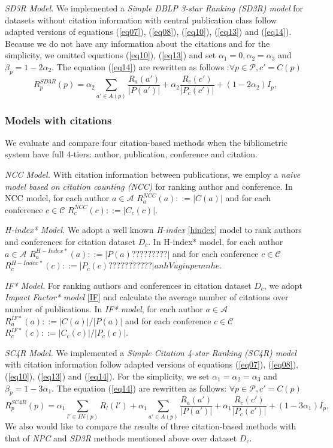 \documentclass[10pt,leqno,twoside]{article}
\begin{document}
\textit{SD3R Model.} We implemented a \textit{Simple DBLP 3-star Ranking (SD3R) model} for datasets without citation information with central publication class follow adapted versions of equations (\ref{eq07}), (\ref{eq08}), (\ref{eq10}), (\ref{eq13}) and (\ref{eq14}).
Because we do not have any information about the citations and for the simplicity, we omitted equations (\ref{eq10}), (\ref{eq13}) and set $\alpha_1=0, \alpha_2=\alpha_3$ and $\beta_p = 1-2\alpha_2 $.  The equation (\ref{eq14}) are rewritten as follows :$\forall p\in\mathcal{P}, c' = C(p)$\
\begin{equation}\label{eq15}
R^{SD3R}_p(p) = \alpha_2\sum_{a'\in A(p)}\frac{R_a(a')}{|P(a')|} + \alpha_2\frac{R_c(c')}{|P_c(c')|} + (1-2\alpha_2)I_p,
\end{equation}
%

\subsubsection{Models with citations}
We evaluate and compare four citation-based methods when the bibliometric system have full 4-tiers: author, publication, conference and citation.

\textit{NCC Model.} With citation information between publications, we employ a \textit{naive model based on citation counting (NCC)} for ranking author and conference. In NCC model, for each author $a \in \mathcal{A}$  $R^{NCC}_a(a) ::= |C(a)| $ and for each conference $c \in \mathcal{C}$  $R^{NCC}_c(c) ::= |C_c(c)|$.

\textit{H-index* Model.} We adopt a well known \textit{H-index} \ref{hindex} model to rank authors and conferences for citation dataset $D_c$. In H-index* model, for each author $a \in \mathcal{A}$  $R^{H-Index*}_a(a) ::= |P(a)?????????| $ and for each conference $c \in \mathcal{C}$  $R^{H-Index*}_c(c) ::= |P_c(c)???????????|
anh Vu giup em nhe$.

\textit{IF* Model.} For ranking authors and conferences in citation dataset $D_c$, we adopt \textit{Impact Factor* model} \ref{IF} and calculate the average number of citations over number of publications. In \textit{IF* model}, for each author $a \in \mathcal{A}$  $R^{IF*}_a(a) ::= |C(a)|/|P(a)| $ and for each conference $c \in \mathcal{C}$  $R^{IF*}_c(c) ::= |C_c(c)|/|P_c(c)|$.

\textit{SC4R Model.} We implemented a \textit{Simple Citation 4-star Ranking (SC4R) model} with citation information follow adapted versions of equations (\ref{eq07}), (\ref{eq08}), (\ref{eq10}), (\ref{eq13}) and (\ref{eq14}).
For the simplicity, we set $\alpha_1=\alpha_2=\alpha_3$ and $\beta_p = 1-3\alpha_1 $.  The equation (\ref{eq14}) are rewritten as follows: $\forall p\in\mathcal{P}, c' = C(p)$\
\begin{equation}\label{eq16}
R^{SC4R}_p(p) = \alpha_1\sum_{l'\in IN(p)}R_l(l') + \alpha_1\sum_{a'\in A(p)}\frac{R_a(a')}{|P(a')|} + \alpha_1\frac{R_c(c')}{|P_c(c')|} + (1-3\alpha_1)I_p,
\end{equation}
We also would like to compare the results of three citation-based methods with that of \textit{NPC} and \textit{SD3R} methods mentioned above over dataset $D_c$.
\end{document}
